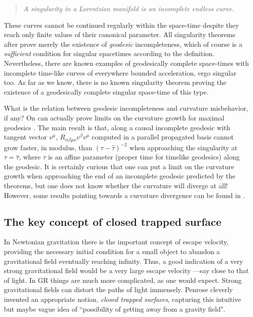 \documentclass[12pt]{iopart}
\begin{document}
\begin{quotation}
{\it A singularity in a Lorentzian manifold  is an incomplete endless curve.}
\end{quotation}

These curves cannot be continued regularly within the 
space-time despite they reach only finite values of their canonical 
parameter. All singularity theorems after \cite{P} prove merely the existence of {\em geodesic} incompleteness, 
which of course is a {\em sufficient} condition for singular spacetimes according to the definition. Nevertheless, there are known examples \cite{Ge2,Beem} of geodesically complete space-times 
with incomplete time-like curves of everywhere bounded acceleration, ergo singular too. As far as we know, there is no known singularity theorem proving the existence of a geodesically complete singular space-time of this type.

What is the relation between geodesic incompleteness 
and curvature misbehavior, if any? 
On can actually prove limits on the curvature growth for maximal geodesics
\cite{T2,KR,Ne,Szab}. The main result is that, along a causal incomplete geodesic with tangent vector $v^{\mu}$, $R_{\alpha\beta\mu\nu}v^{\beta}v^{\mu}$ computed in a parallel propagated basis cannot grow faster, in modulus, than
$(\tau -\hat{\tau})^{-2}$ when approaching the singularity at $\tau = \hat{\tau}$, where $\tau$ is an affine parameter (proper time for timelike geodesics) along the geodesic.
It is certainly curious that one can put a limit on the curvature growth when
approaching the end of an incomplete geodesic predicted by the theorems, but one
does not know whether the curvature will diverge at all! However, some results pointing towards a curvature divergence can be found in \cite{Cla1,Cla2,Cla3,Cla4,CS,Tho,TCE}. 








\subsection{The key concept of closed trapped surface}\label{subsec:trapped}
In Newtonian gravitation there is the important concept of escape velocity, providing the necessary initial condition for a small object to abandon a gravitational field eventually reaching infinity. Thus, a good indication of a very strong gravitational field would be a very large escape velocity ---say close to that of light. In GR things are much more complicated, as one would expect. Strong gravitational fields can distort the paths of light immensely. Penrose cleverly invented an appropriate notion, {\em closed trapped surfaces}, capturing this intuitive but maybe vague idea of ``possibility of getting away from a gravity field".
\end{document}
